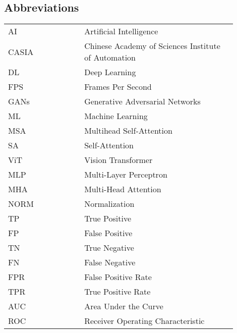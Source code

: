 \begin{center}
    \section*{Abbreviations}
    \begin{table}[h]
        \centering
        \renewcommand{\arraystretch}{1.5}
        \begin{tabular}{@{}p{0.3\linewidth}p{0.6\linewidth}@{}}
            AI    & Artificial Intelligence                             \\
            CASIA & Chinese Academy of Sciences Institute of Automation \\
            DL    & Deep Learning                                       \\
            FPS   & Frames Per Second                                   \\
            GANs  & Generative Adversarial Networks                     \\
            ML    & Machine Learning                                    \\
            MSA   & Multihead Self-Attention                            \\
            SA    & Self-Attention                                      \\
            ViT   & Vision Transformer                                  \\
            MLP   & Multi-Layer Perceptron                             \\
            MHA   & Multi-Head Attention                                \\
            NORM  & Normalization                                       \\
            TP  & True Positive                                      \\
            FP  & False Positive                                    \\
            TN  & True Negative                                      \\
            FN  & False Negative                                      \\
            FPR & False Positive Rate                                  \\ 
            TPR & True Positive Rate                                    \\
            AUC & Area Under the Curve                                   \\
            ROC & Receiver Operating Characteristic                       \\               
        \end{tabular}
    \end{table}
\end{center}
